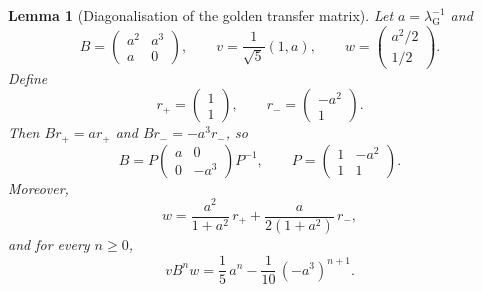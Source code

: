 \documentclass{etds}%
\numberwithin{equation}{section}
\theoremstyle{plain}
\newtheorem{lemma}[theorem]{Lemma}
\theoremstyle{definition}
\theoremstyle{remark}
\begin{document}
\begin{lemma}[Diagonalisation of the golden transfer matrix]
\label{lem:golden-transfer-diagonalization}
Let $a=\lambda_{\mathrm G}^{-1}$ and
\[
B=\begin{pmatrix}a^2&a^3\\ a&0\end{pmatrix},\qquad
v=\frac1{\sqrt{5}}(1,a),\qquad
w=\begin{pmatrix}a^2/2\\[2pt]1/2\end{pmatrix}.
\]
Define
\[
r_+=\begin{pmatrix}1\\ 1\end{pmatrix},
\qquad
r_-=\begin{pmatrix}-a^2\\ 1\end{pmatrix}.
\]
Then $Br_+=ar_+$ and $Br_-=-a^3r_-$, so
\[
B=P\begin{pmatrix}a&0\\ 0&-a^3\end{pmatrix}P^{-1},
\qquad
P=\begin{pmatrix}1&-a^2\\ 1&1\end{pmatrix}.
\]
Moreover,
\[
w=\frac{a^2}{1+a^2}\,r_+ + \frac{a}{2(1+a^2)}\,r_-,
\]
and for every $n\ge 0$,
\[
vB^n w=\frac15\,a^n-\frac1{10}\,(-a^3)^{n+1}.
\]
\end{lemma}
\end{document}
